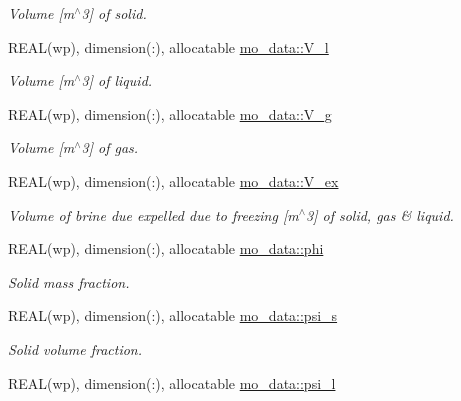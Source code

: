 \begin{DoxyCompactItemize}
\begin{DoxyCompactList}\small\item\em Volume \mbox{[}m$^\wedge$3\mbox{]} of solid. \item\end{DoxyCompactList}\item 
REAL(wp), dimension(:), allocatable \hyperlink{namespacemo__data_ab24341b1a6dd799e63540fa8ed51d14c}{mo\_\-data::V\_\-l}
\begin{DoxyCompactList}\small\item\em Volume \mbox{[}m$^\wedge$3\mbox{]} of liquid. \item\end{DoxyCompactList}\item 
REAL(wp), dimension(:), allocatable \hyperlink{namespacemo__data_a274fbc519dd799929a177fdeaec56e91}{mo\_\-data::V\_\-g}
\begin{DoxyCompactList}\small\item\em Volume \mbox{[}m$^\wedge$3\mbox{]} of gas. \item\end{DoxyCompactList}\item 
REAL(wp), dimension(:), allocatable \hyperlink{namespacemo__data_abb13ad5e80b57e5d614b9888531a3201}{mo\_\-data::V\_\-ex}
\begin{DoxyCompactList}\small\item\em Volume of brine due expelled due to freezing \mbox{[}m$^\wedge$3\mbox{]} of solid, gas \& liquid. \item\end{DoxyCompactList}\item 
REAL(wp), dimension(:), allocatable \hyperlink{namespacemo__data_ace165f21c4edcf77372b13a99161aec8}{mo\_\-data::phi}
\begin{DoxyCompactList}\small\item\em Solid mass fraction. \item\end{DoxyCompactList}\item 
REAL(wp), dimension(:), allocatable \hyperlink{namespacemo__data_a655b6d5f770ca3b4a1d2e22b627844e9}{mo\_\-data::psi\_\-s}
\begin{DoxyCompactList}\small\item\em Solid volume fraction. \item\end{DoxyCompactList}\item 
REAL(wp), dimension(:), allocatable \hyperlink{namespacemo__data_aac8ca74ef10b90da7bf9143bdc21ec3a}{mo\_\-data::psi\_\-l}

\end{DoxyCompactItemize}
